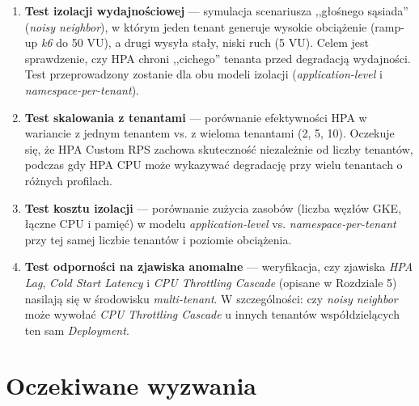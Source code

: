 \begin{enumerate}
  \item \textbf{Test izolacji wydajnościowej} — symulacja scenariusza ,,głośnego sąsiada'' (\textit{noisy neighbor}), w którym jeden tenant generuje wysokie obciążenie (ramp-up \textit{k6} do 50 VU), a drugi wysyła stały, niski ruch (5 VU). Celem jest sprawdzenie, czy HPA chroni ,,cichego'' tenanta przed degradacją wydajności. Test przeprowadzony zostanie dla obu modeli izolacji (\textit{application-level} i \textit{namespace-per-tenant}).

  \item \textbf{Test skalowania z tenantami} — porównanie efektywności HPA w wariancie z jednym tenantem vs. z wieloma tenantami (2, 5, 10). Oczekuje się, że HPA Custom RPS zachowa skuteczność niezależnie od liczby tenantów, podczas gdy HPA CPU może wykazywać degradację przy wielu tenantach o różnych profilach.

  \item \textbf{Test kosztu izolacji} — porównanie zużycia zasobów (liczba węzłów GKE, łączne CPU i pamięć) w modelu \textit{application-level} vs. \textit{namespace-per-tenant} przy tej samej liczbie tenantów i poziomie obciążenia.

  \item \textbf{Test odporności na zjawiska anomalne} — weryfikacja, czy zjawiska \textit{HPA Lag}, \textit{Cold Start Latency} i \textit{CPU Throttling Cascade} (opisane w Rozdziale 5) nasilają się w środowisku \textit{multi-tenant}. W szczególności: czy \textit{noisy neighbor} może wywołać \textit{CPU Throttling Cascade} u innych tenantów współdzielących ten sam \textit{Deployment}.
\end{enumerate}

\section{Oczekiwane wyzwania}

